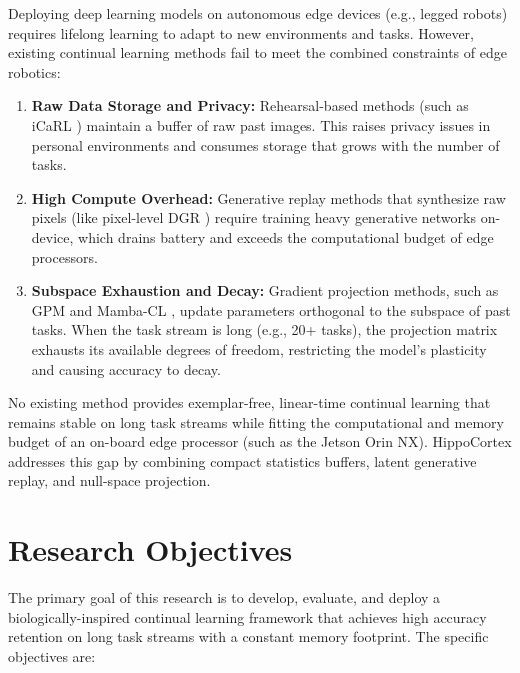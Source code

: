 Deploying deep learning models on autonomous edge devices (e.g., legged robots) requires lifelong learning to adapt to new environments and tasks. However, existing continual learning methods fail to meet the combined constraints of edge robotics:
\begin{enumerate}
    \item \textbf{Raw Data Storage and Privacy:} Rehearsal-based methods (such as iCaRL \cite{venThreeScenariosContinual2019}) maintain a buffer of raw past images. This raises privacy issues in personal environments and consumes storage that grows with the number of tasks.
    
    \item \textbf{High Compute Overhead:} Generative replay methods that synthesize raw pixels (like pixel-level DGR \cite{shinContinualLearningDeep2017}) require training heavy generative networks on-device, which drains battery and exceeds the computational budget of edge processors.
    
    \item \textbf{Subspace Exhaustion and Decay:} Gradient projection methods, such as GPM \cite{sahaGradientProjectionMemory2021} and Mamba-CL \cite{chengMambaCLOptimizingSelective2025}, update parameters orthogonal to the subspace of past tasks. When the task stream is long (e.g., 20+ tasks), the projection matrix exhausts its available degrees of freedom, restricting the model's plasticity and causing accuracy to decay.
\end{enumerate}

No existing method provides exemplar-free, linear-time continual learning that remains stable on long task streams while fitting the computational and memory budget of an on-board edge processor (such as the Jetson Orin NX). HippoCortex addresses this gap by combining compact statistics buffers, latent generative replay, and null-space projection.

\section{Research Objectives}
\label{sec:objectives}

The primary goal of this research is to develop, evaluate, and deploy a biologically-inspired continual learning framework that achieves high accuracy retention on long task streams with a constant memory footprint. The specific objectives are:

